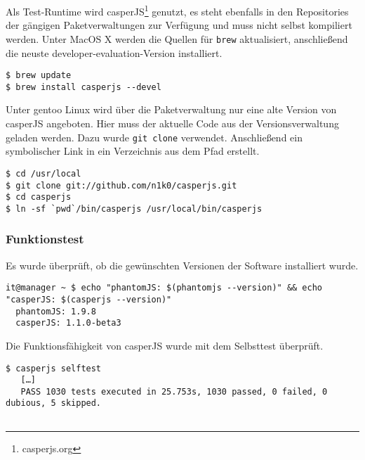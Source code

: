 Als Test-Runtime wird casperJS\footnote{casperjs.org} genutzt, es steht
ebenfalls in den Repositories der gängigen Paketverwaltungen zur
Verfügung und muss nicht selbst kompiliert werden. Unter MacOS X werden
die Quellen für \texttt{brew} aktualisiert, anschließend die neuste
developer-evaluation-Version installiert.

\begin{verbatim}
$ brew update
$ brew install casperjs --devel
\end{verbatim}

Unter gentoo Linux wird über die Paketverwaltung nur eine alte Version
von casperJS angeboten. Hier muss der aktuelle Code aus der
Versionsverwaltung geladen werden. Dazu wurde \texttt{git clone}
verwendet. Anschließend ein symbolischer Link in ein Verzeichnis aus dem
Pfad erstellt.

\begin{verbatim}
$ cd /usr/local
$ git clone git://github.com/n1k0/casperjs.git
$ cd casperjs
$ ln -sf `pwd`/bin/casperjs /usr/local/bin/casperjs
\end{verbatim}

\subsubsection{Funktionstest}\label{funktionstest}

Es wurde überprüft, ob die gewünschten Versionen der Software
installiert wurde.

\begin{verbatim}
it@manager ~ $ echo "phantomJS: $(phantomjs --version)" && echo "casperJS: $(casperjs --version)"
  phantomJS: 1.9.8
  casperJS: 1.1.0-beta3
\end{verbatim}

Die Funktionsfähigkeit von casperJS wurde mit dem Selbsttest überprüft.

\begin{verbatim}
$ casperjs selftest
   […]
   PASS 1030 tests executed in 25.753s, 1030 passed, 0 failed, 0 dubious, 5 skipped.
   
\end{verbatim}
